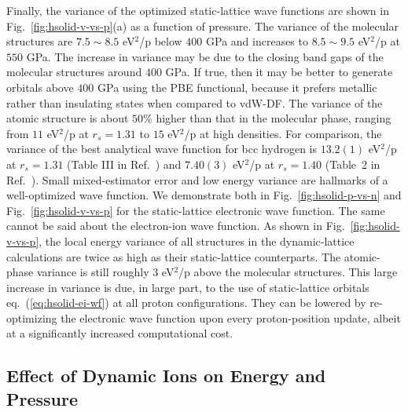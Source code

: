 Finally, the variance of the optimized static-lattice wave functions are shown in Fig.~\ref{fig:hsolid-v-vs-p}(a) as a function of pressure.
The variance of the molecular structures are $7.5\sim8.5$ eV$^2$/p below $400$ GPa and increases to $8.5\sim9.5$ eV$^2$/p at $550$ GPa.
The increase in variance may be due to the closing band gaps of the molecular structures around $400$ GPa.
If true, then it may be better to generate orbitals above $400$ GPa using the PBE functional, because it prefers metallic rather than insulating states when compared to vdW-DF.
The variance of the atomic structure is about $50$\% higher than that in the molecular phase, ranging from $11$ eV$^2$/p at $r_s=1.31$ to $15$ eV$^2$/p at high densities.
For comparison, the variance of the best analytical wave function for bcc hydrogen is $13.2(1)$ eV$^2$/p at $r_s=1.31$ (Table III in Ref.~\cite{Holzmann2003}) and $7.40(3)$ eV$^2$/p at $r_s=1.40$ (Table~2 in Ref.~\cite{Pierleoni2008}).
Small mixed-estimator error and low energy variance are hallmarks of a well-optimized wave function. We demonstrate both in Fig.~\ref{fig:hsolid-p-vs-n} and Fig.~\ref{fig:hsolid-v-vs-p} for the static-lattice electronic wave function.
The same cannot be said about the electron-ion wave function.
As shown in Fig.~\ref{fig:hsolid-v-vs-p}, the local energy variance of all structures in the dynamic-lattice calculations are twice as high as their static-lattice counterparts.
The atomic-phase variance is still roughly $3$ eV$^2$/p above the molecular structures.
This large increase in variance is due, in large part, to the use of static-lattice orbitals eq.~(\ref{eq:hsolid-ei-wf}) at all proton configurations.
They can be lowered by re-optimizing the electronic wave function upon every proton-position update, albeit at a significantly increased computational cost.

\subsection{Effect of Dynamic Ions on Energy and Pressure}
\label{sec:hsolid-dep}

